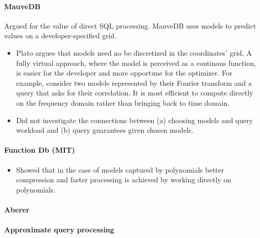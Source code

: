 \paragraph{MauveDB} Argued for the value of direct SQL processing. MauveDB uses models to predict values on a developer-specified grid. 

\begin{itemize}
\item Plato argues that models need no be discretized in the coordinates' grid. A fully virtual approach, where the model is perceived as a continous function, is easier for the developer and more opportune for the optimizer. For example, consider two models represented by their Fourier transform and a query that asks for their correlation. It is most efficient to compute directly on the frequency domain rather than bringing back to time domain.
%
\item Did not investigate the connections between (a) choosing models and query workload and (b) query guarantees given chosen models.
\end{itemize}


\paragraph{Function Db (MIT)} 
\begin{itemize}
\item Showed that in the case of models captured by polynomials better compression and faster processing is achieved by working directly on polynomials.
\end{itemize}


\paragraph{Aberer}


\paragraph{Approximate query processing}